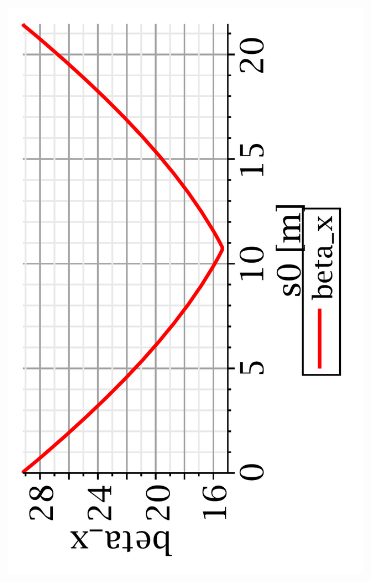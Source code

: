 \documentclass[t]{beamer}
\begin{document}
\begin{frame}{}
\begin{columns}
\begin{column}[t]{0.45\linewidth}
%
\begin{figure}[h]
\centering
\includegraphics[scale=0.24, angle=-90]{MAPLE-betax_1cell.pdf}
\end{figure}
\end{column}
%
\begin{column}[t]{0.45\linewidth}
\begin{figure}[h]
\centering

\end{figure}
\end{column}
\end{columns}
\end{frame}
\end{document}
